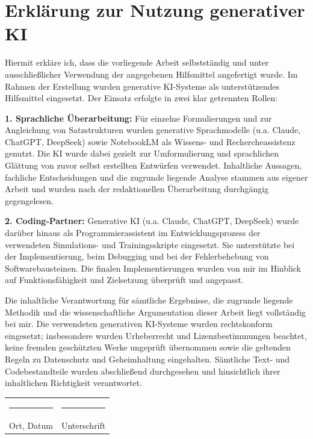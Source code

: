 \thispagestyle{empty}
\section*{Erklärung zur Nutzung generativer KI}

Hiermit erkläre ich, dass die vorliegende Arbeit selbstständig und unter ausschließlicher Verwendung der angegebenen Hilfsmittel angefertigt wurde. Im Rahmen der Erstellung wurden generative KI-Systeme als unterstützendes Hilfsmittel eingesetzt. Der Einsatz erfolgte in zwei klar getrennten Rollen:

\textbf{1. Sprachliche Überarbeitung:} Für einzelne Formulierungen und zur Angleichung von Satzstrukturen wurden generative Sprachmodelle (u.a. Claude, ChatGPT, DeepSeek) sowie NotebookLM als Wissens- und Rechercheassistenz genutzt. Die KI wurde dabei gezielt zur Umformulierung und sprachlichen Glättung von zuvor selbst erstellten Entwürfen verwendet. Inhaltliche Aussagen, fachliche Entscheidungen und die zugrunde liegende Analyse stammen aus eigener Arbeit und wurden nach der redaktionellen Überarbeitung durchgängig gegengelesen.

\textbf{2. Coding-Partner:} Generative KI (u.a. Claude, ChatGPT, DeepSeek) wurde darüber hinaus als Programmierassistent im Entwicklungsprozess der verwendeten Simulations- und Trainingsskripte eingesetzt. Sie unterstützte bei der Implementierung, beim Debugging und bei der Fehlerbehebung von Softwarebausteinen. Die finalen Implementierungen wurden von mir im Hinblick auf Funktionsfähigkeit und Zielsetzung überprüft und angepasst.

Die inhaltliche Verantwortung für sämtliche Ergebnisse, die zugrunde liegende Methodik und die wissenschaftliche Argumentation dieser Arbeit liegt vollständig bei mir. Die verwendeten generativen KI-Systeme wurden rechtskonform eingesetzt; insbesondere wurden Urheberrecht und Lizenzbestimmungen beachtet, keine fremden geschützten Werke ungeprüft übernommen sowie die geltenden Regeln zu Datenschutz und Geheimhaltung eingehalten. Sämtliche Text- und Codebestandteile wurden abschließend durchgesehen und hinsichtlich ihrer inhaltlichen Richtigkeit verantwortet.

\vspace{1.2cm}

\begin{tabular}{@{}p{6cm}p{8cm}@{}}
\rule{4.5cm}{0.4pt} & \rule{5.5cm}{0.4pt} \\
\small Ort, Datum & \small Unterschrift
\end{tabular}

